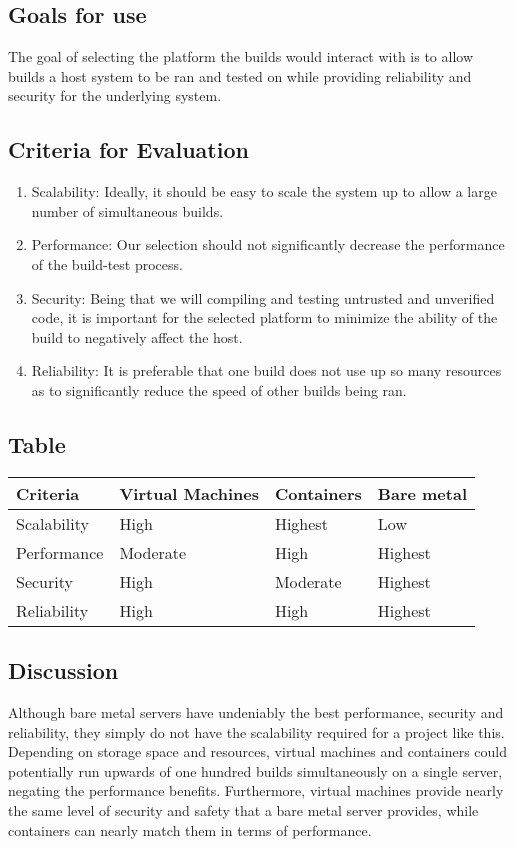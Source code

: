 \documentclass[10pt,letterpaper,onecolumn,journal]{IEEEtran}
\begin{document}
\subsection{Goals for use}
The goal of selecting the platform the builds would interact with is to allow builds a host system to be ran and tested on while providing reliability and security for the underlying system.
\subsection{Criteria for Evaluation}
\begin{enumerate}
  \item Scalability: Ideally, it should be easy to scale the system up to allow a large number of simultaneous builds.
  \item Performance: Our selection should not significantly decrease the performance of the build-test process.
  \item Security: Being that we will compiling and testing untrusted and unverified code, it is important for the selected platform to minimize the ability of the build to negatively affect the host.
  \item Reliability: It is preferable that one build does not use up so many resources as to significantly reduce the speed of other builds being ran.
\end{enumerate}
\subsection{Table}
\begin{center}
  \begin{tabular}{llll}
    Criteria & Virtual Machines & Containers & Bare metal \\ \midrule
    Scalability       & High & Highest & Low \\ \midrule
    Performance           & Moderate & High & Highest \\ \midrule
    Security       & High & Moderate & Highest \\ \midrule
    Reliability  & High & High & Highest \\ \bottomrule
  \end{tabular}
\end{center}
\subsection{Discussion}
Although bare metal servers have undeniably the best performance, security and reliability, they simply do not have the scalability required for a project like this. Depending on storage space and resources, virtual machines and containers could potentially run upwards of one hundred builds simultaneously on a single server, negating the performance benefits. Furthermore, virtual machines provide nearly the same level of security and safety that a bare metal server provides, while containers can nearly match them in terms of performance.
\end{document}

